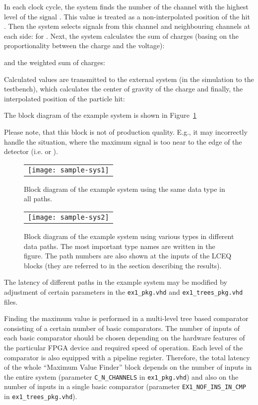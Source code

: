 \documentclass[preprint,11pt]{elsarticle}
\begin{document}
In each clock cycle, the system finds the number of the channel with the highest level of the signal . This value is treated as a non-interpolated position of the hit .
Then the system selects signals from this channel and  neighbouring channels at each side:  for . Next, the system calculates the sum of charges (basing on the proportionality between the charge and the voltage):
	
 and the weighted sum of charges:
	
Calculated values are transmitted to the external system (in the simulation to the
testbench), which calculates the center of gravity of the charge and finally, the interpolated position of the particle hit:
	

	
The block diagram of the example system is shown in Figure~\ref{fig:sample-sys1}
	
Please note, that this block is not of production quality. E.g., it may incorrectly
handle the situation, where the maximum signal is too near to the edge of the detector
	(i.e.  or ).
\begin{figure}[t]
 {   
   \begin{center}
   \begin{tabular}{c}
	   \texttt{[image: sample-sys1]}
   \end{tabular}
   \end{center}
   \caption
	{ \label{fig:sample-sys1}
	Block diagram of the example system using the same data type in all paths.
	}
   }
\end{figure}
\begin{figure}[t]
 {   
   \begin{center}
   \begin{tabular}{c}
	   \texttt{[image: sample-sys2]}
   \end{tabular}
   \end{center}
   \caption
	{ \label{fig:sample-sys2}
	Block diagram of the example system using various types in different data paths.
	The most important type names are written in the figure.
	The path numbers are also shown at the inputs of the LCEQ blocks (they are referred to
	in the section describing the results).
	}
   }
\end{figure}

The latency of different paths in the example system may be modified by adjustment
of certain parameters in the \verb|ex1_pkg.vhd| and \verb|ex1_trees_pkg.vhd| files.

Finding the maximum value is performed in a multi-level tree based comparator consisting of a certain number 	of basic comparators. 
The number of inputs of each basic comparator should be chosen depending on the hardware features of the particular FPGA device and required speed of operation.
Each level of the comparator is also equipped with a pipeline register. 
Therefore, the total latency of the whole ``Maximum Value Finder'' block depends
on the number of inputs in the entire system (parameter \verb|C_N_CHANNELS| in
\verb|ex1_pkg.vhd|) and also on the number of inputs in a single basic comparator
(parameter \verb|EX1_NOF_INS_IN_CMP| in \verb|ex1_trees_pkg.vhd|).
\end{document}
